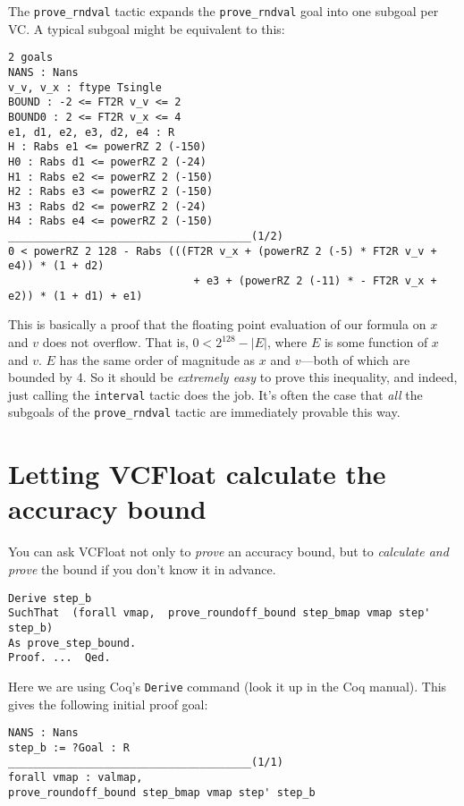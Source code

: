 \documentclass[article]{memoir}
\begin{document}
\pagebreak
The \lstinline{prove_rndval} tactic expands
the \lstinline{prove_rndval} goal into one subgoal per VC.
A typical subgoal might be equivalent to this:

\begin{lstlisting}
2 goals
NANS : Nans
v_v, v_x : ftype Tsingle
BOUND : -2 <= FT2R v_v <= 2
BOUND0 : 2 <= FT2R v_x <= 4
e1, d1, e2, e3, d2, e4 : R
H : Rabs e1 <= powerRZ 2 (-150)
H0 : Rabs d1 <= powerRZ 2 (-24)
H1 : Rabs e2 <= powerRZ 2 (-150)
H2 : Rabs e3 <= powerRZ 2 (-150)
H3 : Rabs d2 <= powerRZ 2 (-24)
H4 : Rabs e4 <= powerRZ 2 (-150)
______________________________________(1/2)
0 < powerRZ 2 128 - Rabs (((FT2R v_x + (powerRZ 2 (-5) * FT2R v_v + e4)) * (1 + d2)
                             + e3 + (powerRZ 2 (-11) * - FT2R v_x + e2)) * (1 + d1) + e1)
\end{lstlisting}

This is basically a proof that the floating point evaluation
of our formula on $x$ and $v$ does not
overflow.  That is, $0 < 2^{128}-|E|$, where
$E$ is some function of $x$ and $v$.
$E$ has the same order of magnitude as $x$ and $v$---both of which are bounded
by 4.   So it should be \emph{extremely easy} to prove this
inequality, and indeed, just calling the \lstinline{interval}
tactic does the job.  It's often the case that \emph{all} the
subgoals of the \lstinline{prove_rndval} tactic are
immediately provable this way.

\chapter{Letting VCFloat calculate the accuracy bound}
\label{calculate-bound}

You can ask VCFloat not only to \emph{prove} an accuracy bound,
but to \emph{calculate and prove} the bound if you don't know it
in advance.

\begin{lstlisting}
Derive step_b 
SuchThat  (forall vmap,  prove_roundoff_bound step_bmap vmap step' step_b)
As prove_step_bound.
Proof. ...  Qed.
\end{lstlisting}
Here we are using Coq's \lstinline{Derive} command (look it up in the
Coq manual).  This gives the following initial proof goal:

\begin{lstlisting}
NANS : Nans
step_b := ?Goal : R
______________________________________(1/1)
forall vmap : valmap,
prove_roundoff_bound step_bmap vmap step' step_b
\end{lstlisting}
\end{document}

